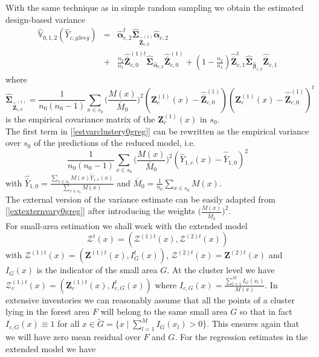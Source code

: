 \documentclass[a4paper,12pt,leqno, titlepage]{article}
\newcommand{\VAR}{\mathbb{V}}
\begin{document}
With the same technique as in simple random sampling we obtain the estimated design-based variance
\begin{eqnarray}\label{estvarclustery0greg}
\hat{\VAR}_{0,1,2}(\hat{Y}_{c,g3reg})&=& \hat{\pmb{\alpha}}^t_{c,2}\hat{\pmb{\Sigma}}_{\hat{\bar{\pmb{Z}}}^{(1)}_{c,0}}\hat{\pmb{\alpha}}_{c,2} \nonumber \\
&+& \frac{n_2}{n_1}\hat{\bar{\pmb{Z}}}_{c,0}^{(1)t}\hat{\pmb{\Sigma}}_{\hat{\pmb{\alpha}}_{c,2}}
\hat{\bar{\pmb{Z}}}_{c,0}^{(1)}+(1-\frac{n_2}{n_1})\hat{\bar{\pmb{Z}}}_{c,1}^t\hat{\pmb{\Sigma}}_{\hat{\pmb{\beta}}_{c,2}}
\hat{\bar{\pmb{Z}}}_{c,1}
\end{eqnarray}
where
\begin{equation*}
\hat{\pmb{\Sigma}}_{\hat{\bar{\pmb{Z}}}^{(1)}_{c,0}}=
\frac{1}{n_0(n_0-1)}\sum_{x\in{s_0}}\big(\frac{M(x)}{\bar{M}_0}\big)^2(\pmb{Z}^{(1)}_c(x)-\hat{\bar{\pmb{Z}}}^{(1)}_{c,0})
(\pmb{Z}^{(1)}_c(x)-\hat{\bar{\pmb{Z}}}^{(1)}_{c,0})^t
\end{equation*}
\noindent is the empirical covariance matrix of the $\pmb{Z}^{(1)}_c(x)$ in $s_0$.\\
The first term in [\ref{estvarclustery0greg}] can be rewritten as the empirical variance over $s_0$ of the predictions of the reduced model, i.e.
\begin{equation*}
\frac{1}{n_0(n_0-1)}\sum_{x\in{s_0}}\big(\frac{M(x)}{\bar{M}_0}\big)^2(\hat{Y}_{1,c}(x)-
\hat{\bar{Y}}_{1,0})^2
\end{equation*}
with $\hat{\bar{Y}}_{1,0}=\frac{\sum_{x\in{s_0}}M(x)\hat{Y}_{1,c}(x)}{\sum_{x\in{s_0}}M(x)}$ and
$\bar{M}_0=\frac{1}{n_0}\sum_{x\in{s_0}}M(x)$.\\
The external version of the variance estimate can be easily adapted from [\ref{extexternvary0greg}] after introducing the weights $\big(\frac{M(x)}{\bar{M}_k}\Big)^2$.\\
For small-area estimation we shall work with the extended model
\begin{equation*}
\pmb{\mathcal{Z}}^t(x)=(\pmb{\mathcal{Z}}^{(1)t}(x), \pmb{\mathcal{Z}}^{(2)t}(x))
\end{equation*}
 with
$\pmb{\mathcal{Z}}^{(1)t}(x)=(\pmb{Z}^{(1)t}(x), I_G^t(x))$, $\pmb{\mathcal{Z}}^{(2)t}(x)=\pmb{Z}^{(2)t}(x)$ and $I_G(x)$ is the indicator of the small area $G$. At the cluster level we have $\pmb{\mathcal{Z}}_c^{(1)t}(x)=(\pmb{Z}_c^{(1)t}(x),I^t_{c,G}(x))$ where $I_{c,G}(x)=\frac{\sum_{l=1}^M I_G(x_l)}{M(x)}$. In extensive inventories we can reasonably assume that all the points of a cluster lying in the forest area $F$ will belong to the same small area $G$ so that in fact $I_{c,G}(x) \equiv 1$ for all $x\in{\tilde{G}}=\{x \mid \sum_{l=1}^M I_G(x_l)>0\}$. This ensures again that we will have zero mean residual over $F$ and $G$.  For the regression estimates in the extended model we have
\end{document}
